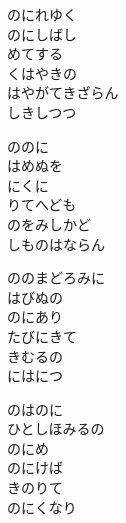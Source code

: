 \documentclass[10pt,b5j]{tarticle} %
\begin{document}
\vspace{1.5em} %
\newcommand{\linespace}{0.5em} %
\newcommand{\blocksize}{0.5\hsize} %
\begin{enumerate} %
    \begin{minipage}[c]{\blocksize}
    
        \vspace{\linespace}
        \item
        のにれゆく\\
        のにしばし\\
        めてする\\
        くはやきの\\
        はやがてきざらん\\
        しきしつつ
        
        \vspace{\linespace}
        \item
        ののに\\
        はめぬを\\
        にくに\\
        りてへども\\
        のをみしかど\\
        しものはならん
        
        \vspace{\linespace}
        \item
        ののまどろみに\\
        はびぬの\\
        のにあり\\
        たびにきて\\
        きむるの\\
        にはにつ
        
        \vspace{\linespace}
        \item
        のはのに\\
        ひとしほみるの\\
        のにめ\\
        のにけば\\
        きのりて\\
        のにくなり
        

\end{minipage}
\end{enumerate}
\end{document}
